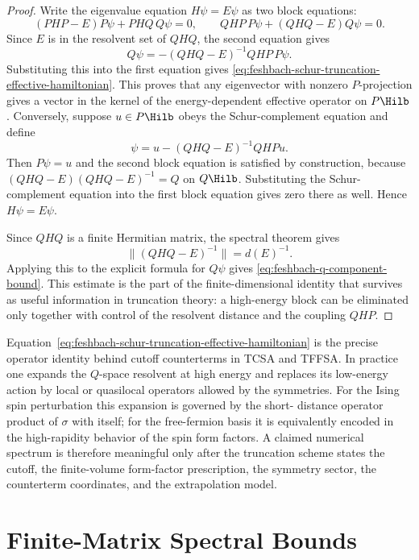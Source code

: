 \begin{proof}
Write the eigenvalue equation \(H\psi=E\psi\) as two block equations:
\[
  (PHP-E)P\psi+PHQ\,Q\psi=0,
  \qquad
  QHP\,P\psi+(QHQ-E)Q\psi=0 .
\]
Since \(E\) is in the resolvent set of \(QHQ\), the second equation gives
\[
  Q\psi=-(QHQ-E)^{-1}QHP\,P\psi .
\]
Substituting this into the first equation gives
\eqref{eq:feshbach-schur-truncation-effective-hamiltonian}.  This proves that
any eigenvector with nonzero \(P\)-projection gives a vector in the kernel of
the energy-dependent effective operator on \(P\Hilb\).  Conversely, suppose
\(u\in P\Hilb\) obeys the Schur-complement equation and define
\[
  \psi=u-(QHQ-E)^{-1}QHPu .
\]
Then \(P\psi=u\) and the second block equation is satisfied by construction,
because \((QHQ-E)(QHQ-E)^{-1}=Q\) on \(Q\Hilb\).  Substituting the
Schur-complement equation into the first block equation gives zero there as
well.  Hence \(H\psi=E\psi\).

Since \(QHQ\) is a finite Hermitian matrix, the spectral theorem gives
\[
  \|(QHQ-E)^{-1}\|=d(E)^{-1}.
\]
Applying this to the explicit formula for \(Q\psi\) gives
\eqref{eq:feshbach-q-component-bound}.  This estimate is the part of the
finite-dimensional identity that survives as useful information in truncation
theory: a high-energy block can be eliminated only together with control of
the resolvent distance and the coupling \(QHP\).
\end{proof}

Equation~\eqref{eq:feshbach-schur-truncation-effective-hamiltonian} is the
precise operator identity behind cutoff counterterms in TCSA and TFFSA.  In
practice one expands the \(Q\)-space resolvent at high energy and replaces its
low-energy action by local or quasilocal operators allowed by the symmetries.
For the Ising spin perturbation this expansion is governed by the short-
distance operator product of \(\sigma\) with itself; for the free-fermion
basis it is equivalently encoded in the high-rapidity behavior of the spin
form factors.  A claimed numerical spectrum is therefore meaningful only
after the truncation scheme states the cutoff, the finite-volume form-factor
prescription, the symmetry sector, the counterterm coordinates, and the
extrapolation model.

\section{Finite-Matrix Spectral Bounds}
\label{sec:finite-matrix-spectral-bounds}

